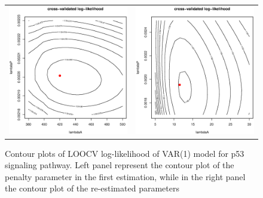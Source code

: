 \documentclass[a4paper]{article}
\begin{document}
\begin{figure}[h!]
\centering
\begin{tabular}{cc}
\includegraphics[scale=0.33]{contPlot.eps}&
\includegraphics[scale=0.33]{contPlot_rf.eps}\\
\end{tabular}
\caption{Contour plots of LOOCV log-likelihood of VAR(1) model for p53 signaling pathway. Left panel represent the contour plot of the penalty parameter in the first estimation, while in the right panel the contour plot of the re-estimated parameters}
\label{fig:contour}
\end{figure}
\end{document}
